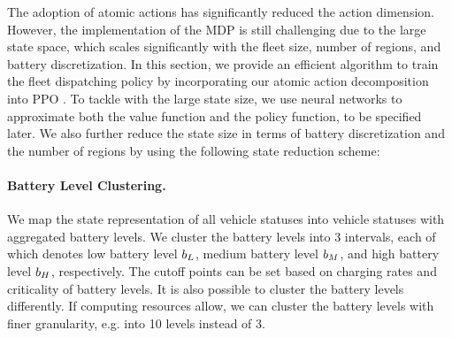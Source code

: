 The adoption of atomic actions has significantly reduced the action dimension. However, the implementation of the MDP is still challenging due to the large state space, which scales significantly with the fleet size, number of regions, and battery discretization. In this section, we provide an efficient algorithm to train the fleet dispatching policy by incorporating our atomic action decomposition into PPO \citep{schulman2017proximal}. To tackle with the large state size, we use neural networks to approximate both the value function and the policy function, to be specified later. We also further reduce the state size in terms of battery discretization and the number of regions by using the following state reduction scheme:

\paragraph{Battery Level Clustering.} We map the state representation of all vehicle statuses into vehicle statuses with aggregated battery levels. We cluster the battery levels into 3 intervals, each of which denotes low battery level $b_L$, medium battery level $b_M$, and high battery level $b_H$, respectively. The cutoff points can be set based on charging rates and criticality of battery levels. It is also possible to cluster the battery levels differently. If computing resources allow, we can cluster the battery levels with finer granularity, e.g. into 10 levels instead of 3. 


